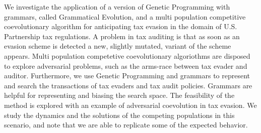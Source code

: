 We investigate the application of a version of Genetic Programming
with grammars, called Grammatical Evolution, and a multi population
competitive coevolutionary algorithm for anticipating tax evasion in
the domain of U.S. Partnership tax regulations. A problem in tax
auditing is that as soon as an evasion scheme is detected a new,
slightly mutated, variant of the scheme appears. Multi population
competetive coevolutionary algoriothms are disposed to explore
adversarial problems, such as the arms-race between tax evader and
auditor. Furthermore, we use Genetic Programming and grammars to
represent and search the transactions of tax evaders and tax audit
policies. Grammars are helpful for representing and biasing the search
space. The feasibility of the method is explored with an example of
adversarial coevolution in tax evasion. We study the dynamics and the
solutions of the competing populations in this scenario, and note that
we are able to replicate some of the expected behavior.
